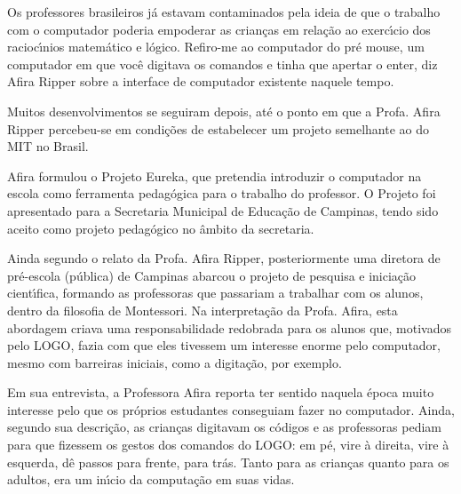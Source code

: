 \documentclass[
12pt,		%
openright,	%
twoside,  %
a4paper,			%
chapter=TITLE,		%
english,			%
french,				%
spanish,			%
brazil				%
]{USPSC-classe/USPSC}
\begin{document}
Os professores brasileiros j\'a estavam contaminados pela ideia de que o trabalho com o computador poderia empoderar as crian\c{c}as em rela\c{c}\~ao ao exerc\'{\i}cio dos racioc\'{\i}nios matem\'atico e l\'ogico. \textquotedbl Refiro-me ao computador do pr\'e mouse, um computador em que voc\^e digitava os comandos e tinha que apertar o enter\textquotedbl , diz Afira Ripper sobre a interface de computador existente naquele tempo.










Muitos desenvolvimentos se seguiram depois, at\'e o ponto em que a Profa. Afira Ripper percebeu-se em condi\c{c}\~oes de estabelecer um projeto semelhante ao do MIT no Brasil.










Afira formulou o Projeto Eureka, que pretendia introduzir o computador na escola como ferramenta pedag\'ogica para o trabalho do professor. O Projeto foi apresentado para a Secretaria Municipal de Educa\c{c}\~ao de Campinas, tendo sido aceito como projeto pedag\'ogico no \^ambito da secretaria.










Ainda segundo o relato da Profa. Afira Ripper, posteriormente uma diretora de pr\'e-escola (p\'ublica) de Campinas abarcou o projeto de pesquisa e inicia\c{c}\~ao cient\'{\i}fica, formando as professoras que passariam a trabalhar com os alunos, dentro da filosofia de Montessori. Na interpreta\c{c}\~ao da Profa. Afira, esta abordagem criava uma responsabilidade redobrada para os alunos que, motivados pelo LOGO, fazia com que eles tivessem um interesse enorme pelo computador, mesmo com barreiras iniciais, como a digita\c{c}\~ao, por exemplo.










Em sua entrevista, a Professora Afira reporta ter sentido naquela \'epoca muito interesse pelo que os pr\'oprios estudantes conseguiam fazer no computador. Ainda, segundo sua descri\c{c}\~ao, as crian\c{c}as digitavam os c\'odigos e as professoras pediam para que fizessem os gestos dos comandos do LOGO: \textquotedbl em p\'e\textquotedbl , \textquotedbl vire \`a direita\textquotedbl , \textquotedbl vire \`a esquerda\textquotedbl , \textquotedbl d\^e passos para frente\textquotedbl , \textquotedbl para tr\'as\textquotedbl . Tanto para as crian\c{c}as quanto para os adultos, era um in\'{\i}cio da computa\c{c}\~ao em suas vidas.
\end{document}
